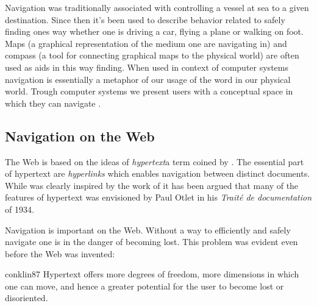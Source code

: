 Navigation was traditionally associated with controlling a vessel at sea to
a given destination.%
Since then it's been used to describe behavior related to safely finding ones
way whether one is driving a car, flying a plane or walking on foot. Maps
(a graphical representation of the medium one are navigating in)
and compass (a tool for connecting graphical maps to the physical world)
are often used as aids in this way finding. When used in context of
computer systems navigation is essentially a metaphor of our usage of the
word in our physical world. Trough computer systems we present users with a
conceptual space in which they can navigate \citep[p.~189]{whiteside85}.

\subsection{Navigation on the Web}
\label{section:background.navigation.navigation.on.the.web}

The Web is based on the ideas of \emph{hypertext}\dash{}a term coined by
\citet[p.~86]{nelson65}. The essential part of hypertext are
\emph{hyperlinks} \citep[p.~90]{nelson65} which enables navigation between
distinct documents. While \citeauthor{nelson65} was clearly
inspired by the work of \citet{bush45} it has been argued \citep{rayward94}
that many of the features of hypertext was envisioned by Paul Otlet in his
\emph{Trait\'e de documentation} of 1934.

Navigation is important on the Web. Without a way to efficiently and safely
navigate one is in the danger of becoming lost. This problem was evident even
before the Web was invented:
\begin{citequote}[p.~38]{conklin87}
  Hypertext offers more degrees of freedom, more dimensions in which one
  can move, and hence a greater potential for the user
  to become lost or disoriented.
\end{citequote}

